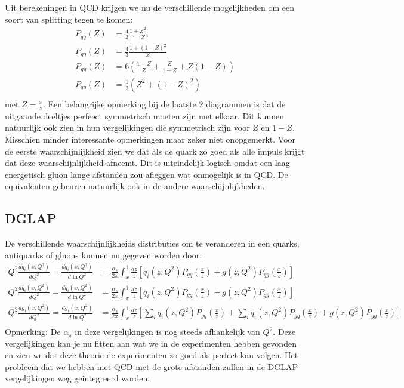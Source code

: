 \documentclass[../main.tex]{subfiles}
\begin{document}
Uit berekeningen in QCD krijgen we nu de verschillende mogelijkheden om een soort van splitting tegen te komen:
\begin{equation}
    \begin{aligned}
        \label{eq:}
        P_{qq}(Z) &= \frac{4}{3} \frac{1+Z^2}{1-Z} \\
        P_{gq}(Z) &= \frac{4}{3} \frac{1+(1-Z)^2}{Z} \\
        P_{gg}(Z) &= 6 \left( \frac{1-Z}{Z} + \frac{Z}{1-Z} + Z(1-Z) \right) \\
        P_{qg}(Z) &= \frac{1}{2} \left( Z^2 + (1-Z)^2 \right) \\
    \end{aligned}
\end{equation}
met $Z= \frac{x}{z}$. Een belangrijke opmerking bij de laatste 2 diagrammen is dat de uitgaande deeltjes perfeect symmetrisch moeten zijn met elkaar. Dit kunnen natuurlijk ook zien in hun vergelijkingen die symmetrisch zijn voor $Z$ en $1-Z$. Misschien minder interessante opmerkingen maar zeker niet onopgemerkt. Voor de eerste waarschijnlijkheid zien we dat als de quark zo goed als alle impuls krijgt dat deze waarschijnlijkheid afneemt. Dit is uiteindelijk logisch omdat een laag energetisch gluon lange afstanden zou afleggen wat onmogelijk is in QCD. De equivalenten gebeuren natuurlijk ook in de andere waarschijnlijkheden.

\subsection{DGLAP}%
\label{sub:dglap}

De verschillende waarschijnlijkheids distributies om te veranderen in een  quarks, antiquarks of gluons kunnen nu gegeven worden door:
\begin{equation}
    \begin{aligned}
        \label{eq:dglap}
        Q^2 \frac{dq_i(x, Q^2)}{dQ^2} = \frac{dq_i(x,Q^2)}{d\ln Q^2} &= \frac{\alpha_s}{2\pi} \int_x^1 \frac{dz}{z} \left[ q_i(z,Q^2)P_{qq}\left( \frac{x}{z} \right) + g(z,Q^2)P_{qg} \left( \frac{x}{z} \right) \right]\\
        Q^2 \frac{d\overline q_i(x, Q^2)}{dQ^2} = \frac{d\overline q_i(x,Q^2)}{d\ln Q^2} &= \frac{\alpha_s}{2\pi} \int_x^1 \frac{dz}{z} \left[ \overline q_i(z,Q^2)P_{qq}\left( \frac{x}{z} \right) + g(z,Q^2)P_{qg} \left( \frac{x}{z} \right) \right]\\
        Q^2 \frac{dg_i(x, Q^2)}{dQ^2} = \frac{dg_i(x,Q^2)}{d\ln Q^2} &= \frac{\alpha_s}{2\pi} \int_x^1 \frac{dz}{z} \left[ \sum_i q_i(z,Q^2)P_{gq}\left( \frac{x}{z} \right) + \sum_i \overline q_i(z,Q^2)P_{gq}\left( \frac{x}{z} \right) + g(z,Q^2)P_{gg} \left( \frac{x}{z} \right) \right]\\
    \end{aligned}
\end{equation}
{\color{green} Opmerking: De $\alpha_s$ in deze vergelijkingen is nog steeds afhankelijk van $Q^2$.}
Deze vergelijkingen kan je nu fitten aan wat we in de experimenten hebben gevonden en zien we dat deze theorie de experimenten zo goed als perfect kan volgen. Het probleem dat we hebben met QCD met de grote afstanden zullen in de DGLAP vergelijkingen weg geintegreerd worden.
\end{document}
